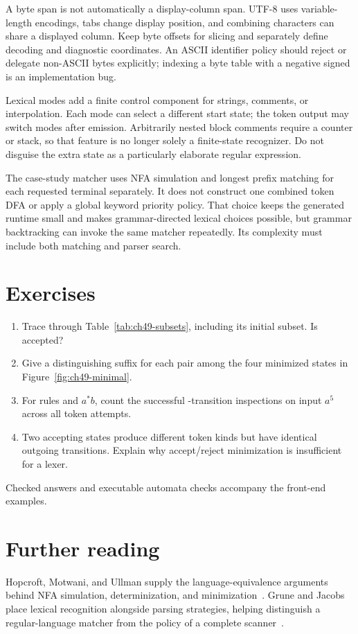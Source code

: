 A byte span is not automatically a display-column span.
UTF-8 uses variable-length encodings, tabs change display position, and combining characters can share a displayed column.
Keep byte offsets for slicing and separately define decoding and diagnostic coordinates.
An ASCII identifier policy should reject or delegate non-ASCII bytes explicitly; indexing a byte table with a negative signed  is an implementation bug.

Lexical modes add a finite control component for strings, comments, or interpolation.
Each mode can select a different start state; the token output may switch modes after emission.
Arbitrarily nested block comments require a counter or stack, so that feature is no longer solely a finite-state recognizer.
Do not disguise the extra state as a particularly elaborate regular expression.

The case-study matcher uses NFA simulation and longest prefix matching for each requested terminal separately.
It does not construct one combined token DFA or apply a global keyword priority policy.
That choice keeps the generated runtime small and makes grammar-directed lexical choices possible, but grammar backtracking can invoke the same matcher repeatedly.
Its complexity must include both matching and parser search.

\section{Exercises}
\label{sec:ch49-exercises}
\begin{enumerate}
\item\label{ex:ch49-subsets} Trace  through Table~\ref{tab:ch49-subsets}, including its initial subset. Is  accepted?
\item\label{ex:ch49-distinguish} Give a distinguishing suffix for each pair among the four minimized states in Figure~\ref{fig:ch49-minimal}.
\item\label{ex:ch49-cost} For rules  and $a^*b$, count the successful -transition inspections on input $a^5$ across all token attempts.
\item\label{ex:ch49-output} Two accepting states produce different token kinds but have identical outgoing transitions. Explain why accept/reject minimization is insufficient for a lexer.
\end{enumerate}
Checked answers and executable automata checks accompany the front-end examples.

\section{Further reading}
\label{sec:ch49-reading}
Hopcroft, Motwani, and Ullman supply the language-equivalence arguments behind NFA simulation, determinization, and minimization~\cite{hopcroft-2007-automata}.
Grune and Jacobs place lexical recognition alongside parsing strategies, helping distinguish a regular-language matcher from the policy of a complete scanner~\cite{grune-2008-parsing}.
